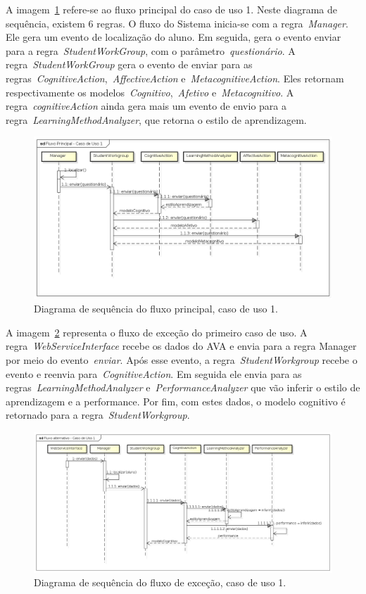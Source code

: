 A imagem~\ref{fig:dss-uc1-fluxo-principal} refere-se ao fluxo principal do caso de uso 1. Neste diagrama de sequência, existem 6 regras. O fluxo do Sistema inicia-se com a regra~\emph{Manager}. Ele gera um evento de localização do aluno. Em seguida, gera o evento enviar para a regra~\emph{StudentWorkGroup}, com o parâmetro~\emph{questionário}. A regra~\emph{StudentWorkGroup} gera o evento de enviar para as regras~\emph{CognitiveAction},~\emph{AffectiveAction} e~\emph{MetacognitiveAction}. Eles retornam respectivamente os modelos~\emph{Cognitivo},~\emph{Afetivo} e~\emph{Metacognitivo}. A regra~\emph{cognitiveAction} ainda gera mais um evento de envio para a regra~\emph{LearningMethodAnalyzer}, que retorna o estilo de aprendizagem.

\begin{figure}
	\centering
	\includegraphics[scale=0.48]{images/dss-uc1-fluxo-principal.png}
	\caption{Diagrama de sequência do fluxo principal, caso de uso 1.}
	\label{fig:dss-uc1-fluxo-principal}
\end{figure}

A imagem~\ref{fig:dss-uc1-fluxo-alternativo} representa o fluxo de exceção do primeiro caso de uso. A regra~\emph{WebServiceInterface} recebe os dados do AVA e envia para a regra Manager por meio do evento~\emph{enviar}. Após esse evento, a regra~\emph{StudentWorkgroup} recebe o evento e reenvia para~\emph{CognitiveAction}. Em seguida ele envia para as regras~\emph{LearningMethodAnalyzer} e~\emph{PerformanceAnalyzer} que vão inferir o estilo de aprendizagem e a performance. Por fim, com estes dados, o modelo cognitivo é retornado para a regra~\emph{StudentWorkgroup}.

\begin{figure}
	\centering
	\includegraphics[scale=0.48]{images/dss-uc1-fluxo-alternativo}
	\caption{Diagrama de sequência do fluxo de exceção, caso de uso 1.}
	\label{fig:dss-uc1-fluxo-alternativo}
\end{figure}

